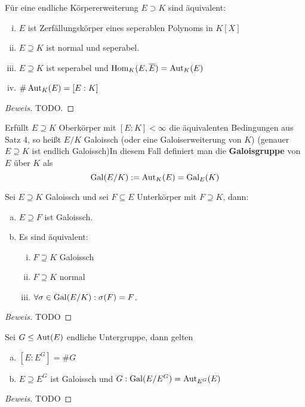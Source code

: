 \documentclass[a4paper]{report}
\begin{document}
\begin{satz}
  Für eine endliche Körpererweiterung $E \supset K$ sind äquivalent:
  \begin{enumerate}[(i)]
    \item $E$ ist Zerfällungskörper eines seperablen Polynoms in $K[X]$
    \item $E \supseteq K$ ist normal und seperabel.
    \item $E \supseteq K$ ist seperabel und $\operatorname{Hom}_{K}(E, \overline E) = \operatorname{Aut}_{K}(E)$
    \item $\#\operatorname{Aut}_{K}(E) = [E:K]$
  \end{enumerate}
  \begin{proof}[Beweis]
TODO.
  \end{proof}
\end{satz}

\begin{defi}
Erfüllt $E \supseteq K$ Oberkörper mit $[E:K] < \infty$ die äquivalenten Bedingungen aus Satz 4, so heißt $E/K$ Galoissch (oder eine Galoiserweiterung von $K$) (genauer $E \supseteq K$ ist endlich Galoissch)In diesem Fall definiert man die \textbf{Galoisgruppe} von $E$ über $K$ als \[\operatorname{Gal}(E/K) := \operatorname{Aut}_{K}(E) = \operatorname{Gal}_{E}(K)\]
\end{defi}
\begin{kor}
  Sei $E \supseteq K$ Galoissch und sei $F \subseteq E$ Unterkörper mit $F \supseteq K$, dann:
  \begin{enumerate}[(a)]
    \item $E \supseteq F$ ist Galoissch.
    \item Es sind äquivalent:
          \begin{enumerate}[(i)]
            \item $F \supseteq K$ Galoissch
            \item $F \supseteq K$ normal
                  \item $\forall \sigma \in \operatorname{Gal}(E/K): \sigma(F) = F$.
          \end{enumerate}
  \end{enumerate}
\begin{proof}[Beweis]
TODO
\end{proof}
\end{kor}

\begin{satz}
  Sei $G \le \operatorname{Aut}(E)$ endliche Untergruppe, dann gelten
  \begin{enumerate}[(a)]
    \item $[E:E^{G}] = \#G$
          \item $E \supseteq E^{G}$ ist Galoissch und $G:\operatorname{Gal}(E/E^{G}) = \operatorname{Aut}_{E^{G}}(E)$
  \end{enumerate}
\begin{proof}[Beweis]
TODO
\end{proof}
\end{satz}
\end{document}
